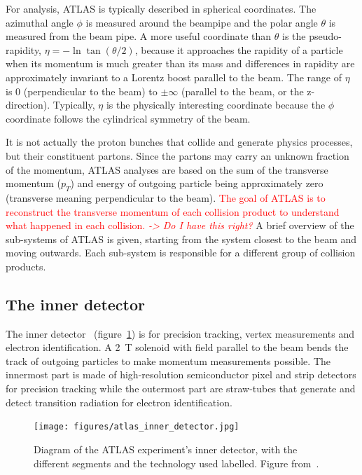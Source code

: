 For analysis, ATLAS is typically described in spherical coordinates. The azimuthal angle $\phi$ is measured around the beampipe and the polar angle $\theta$ is measured from the beam pipe. A more useful coordinate than $\theta$ is the pseudo-rapidity, $\eta = -\ln\tan\left(\theta/2\right)$, because it approaches the rapidity of a particle when its momentum is much greater than its mass and differences in rapidity are approximately invariant to a Lorentz boost parallel to the beam. The range of $\eta$ is 0 (perpendicular to the beam) to $\pm\infty$ (parallel to the beam, or the z-direction). Typically, $\eta$ is the physically interesting coordinate because the $\phi$ coordinate follows the cylindrical symmetry of the beam.

It is not actually the proton bunches that collide and generate physics processes, but their constituent partons. Since the partons may carry an unknown fraction of the momentum, ATLAS analyses are based on the sum of the transverse momentum ($p_T$) and energy of outgoing particle being approximately zero (transverse meaning perpendicular to the beam). \textcolor{red}{The goal of ATLAS is to reconstruct the transverse momentum of each collision product to understand what happened in each collision. \textit{-> Do I have this right?}} A brief overview of the sub-systems of ATLAS is given, starting from the system closest to the beam and moving outwards. Each sub-system is responsible for a different group of collision products.

\subsection{The inner detector}

The inner detector~\cite{atlas_inner_detector_tdr_1, atlas_inner_detector_tdr_2} (figure~\ref{fig:atlas_inner_detector}) is for precision tracking, vertex measurements and electron identification. A \SI{2}{\tesla} solenoid with field parallel to the beam bends the track of outgoing particles to make momentum measurements possible. The innermost part is made of high-resolution semiconductor pixel and strip detectors for precision tracking while the outermost part are straw-tubes that generate and detect transition radiation for electron identification.

\begin{figure}
    \centering
    \texttt{[image: figures/atlas\_inner\_detector.jpg]}
    \caption{Diagram of the ATLAS experiment's inner detector, with the different segments and the technology used labelled. Figure from~\cite{collaboration_atlas_2008}.}
    \label{fig:atlas_inner_detector}
\end{figure}

